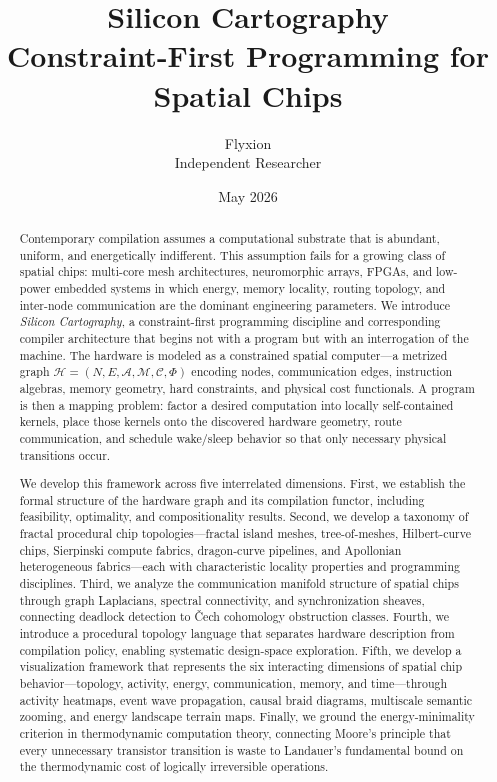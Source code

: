 \documentclass[11pt, a4paper]{article}
\title{\textbf{Silicon Cartography}\\
\large Constraint-First Programming for Spatial Chips}
\author{Flyxion\\[0.3em]
\small Independent Researcher}
\date{May 2026}
\begin{document}
\maketitle
\thispagestyle{empty}

\begin{abstract}
Contemporary compilation assumes a computational substrate that is abundant, uniform,
and energetically indifferent. This assumption fails for a growing class of spatial chips:
multi-core mesh architectures, neuromorphic arrays, FPGAs, and low-power embedded systems
in which energy, memory locality, routing topology, and inter-node communication are the
dominant engineering parameters. We introduce \emph{Silicon Cartography}, a
constraint-first programming discipline and corresponding compiler architecture that
begins not with a program but with an interrogation of the machine. The hardware is modeled
as a constrained spatial computer---a metrized graph $\mathcal{H} = (N, E, \mathcal{A},
\mathcal{M}, \mathcal{C}, \Phi)$ encoding nodes, communication edges, instruction algebras,
memory geometry, hard constraints, and physical cost functionals. A program is then a
mapping problem: factor a desired computation into locally self-contained kernels, place
those kernels onto the discovered hardware geometry, route communication, and schedule
wake/sleep behavior so that only necessary physical transitions occur.

We develop this framework across five interrelated dimensions. First, we establish the
formal structure of the hardware graph and its compilation functor, including feasibility,
optimality, and compositionality results. Second, we develop a taxonomy of fractal
procedural chip topologies---fractal island meshes, tree-of-meshes, Hilbert-curve
chips, Sierpinski compute fabrics, dragon-curve pipelines, and Apollonian heterogeneous
fabrics---each with characteristic locality properties and programming disciplines.
Third, we analyze the communication manifold structure of spatial chips through
graph Laplacians, spectral connectivity, and synchronization sheaves, connecting deadlock
detection to Čech cohomology obstruction classes. Fourth, we introduce a procedural
topology language that separates hardware description from compilation policy, enabling
systematic design-space exploration. Fifth, we develop a visualization framework that
represents the six interacting dimensions of spatial chip behavior---topology, activity,
energy, communication, memory, and time---through activity heatmaps, event wave
propagation, causal braid diagrams, multiscale semantic zooming, and energy landscape
terrain maps. Finally, we ground the energy-minimality criterion in thermodynamic
computation theory, connecting Moore's principle that every unnecessary transistor
transition is waste to Landauer's fundamental bound on the thermodynamic cost of
logically irreversible operations.
\end{abstract}
\end{document}
